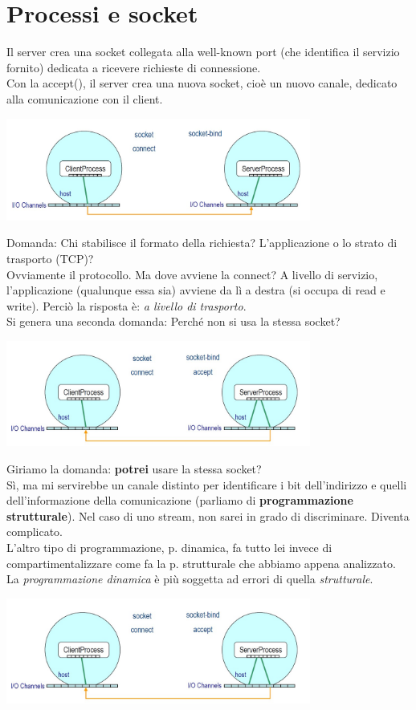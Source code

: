 \section{Processi e socket}
Il server crea una socket collegata alla well-known port (che identifica il servizio fornito) dedicata a ricevere richieste di connessione.
\\Con la accept(), il server crea una nuova socket, cioè un nuovo canale, dedicato alla comunicazione con il client.
\begin{center}
    \includegraphics[width=0.75\textwidth]{img/processi_e_socket2.jpg}
\end{center}
Domanda: Chi stabilisce il formato della richiesta? L'applicazione o lo strato di trasporto (TCP)?
\\Ovviamente il protocollo. Ma dove avviene la connect? A livello di servizio, l'applicazione (qualunque essa sia) avviene da lì a destra (si occupa di read e write). Perciò la risposta è: \textit{a livello di trasporto}.
\\Si genera una seconda domanda: Perché non si usa la stessa socket?
\begin{center}
    \includegraphics[width=0.75\textwidth]{img/processi_e_socket3.jpg}
\end{center}
Giriamo la domanda: \textbf{potrei} usare la stessa socket? 
\\Sì, ma mi servirebbe un canale distinto per identificare i bit dell'indirizzo e quelli dell'informazione della comunicazione (parliamo di \textbf{programmazione strutturale}). Nel caso di uno stream, non sarei in grado di discriminare. Diventa complicato.
\\L'altro tipo di programmazione, p. dinamica, fa tutto lei invece di compartimentalizzare come fa la p. strutturale che abbiamo appena analizzato. La \textit{programmazione dinamica} è più soggetta ad errori di quella \textit{strutturale}.
\begin{center}
    \includegraphics[width=0.75\textwidth]{img/processi_e_socket3.jpg}
\end{center}

